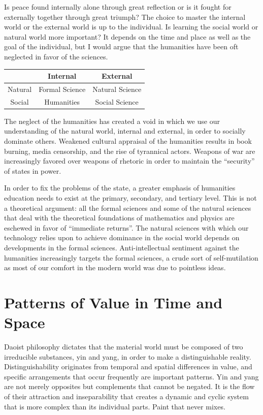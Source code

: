 \documentclass[10pt, a5paper, twoside, openright]{memoir}
\begin{document}
Is peace found internally alone through great reflection or is it fought for externally together through great triumph? The choice to master the internal world or the external world is up to the individual. Is learning the social world or natural world more important? It depends on the time and place as well as the goal of the individual, but I would argue that the humanities have been oft neglected in favor of the sciences.
\begin{center}
\begin{tabular}{| c | c | c |}
\hline
\textit{} & Internal & External \\
\hline
Natural & Formal Science & Natural Science \\
\hline
Social & Humanities & Social Science \\
\hline
\end{tabular}
\end{center}
The neglect of the humanities has created a void in which we use our understanding of the natural world, internal and external, in order to socially dominate others. Weakened cultural appraisal of the humanities results in book burning, media censorship, and the rise of tyrannical actors. Weapons of war are increasingly favored over weapons of rhetoric in order to maintain the ``security'' of states in power.

In order to fix the problems of the state, a greater emphasis of humanities education needs to exist at the primary, secondary, and tertiary level. This is not a theoretical argument: all the formal sciences and some of the natural sciences that deal with the theoretical foundations of mathematics and physics are eschewed in favor of ``immediate returns''. The natural sciences with which our technology relies upon to achieve dominance in the social world depends on developments in the formal sciences. Anti-intellectual sentiment against the humanities increasingly targets the formal sciences, a crude sort of self-mutilation as most of our comfort in the modern world was due to pointless ideas.


\section{Patterns of Value in Time and Space}
Daoist philosophy dictates that the material world must be composed of two irreducible substances, yin and yang, in order to make a distinguishable reality. Distinguishability originates from temporal and spatial differences in value, and specific arrangements that occur frequently are important patterns. Yin and yang are not merely opposites but complements that cannot be negated. It is the flow of their attraction and inseparability that creates a dynamic and cyclic system that is more complex than its individual parts. Paint that never mixes.
\end{document}
